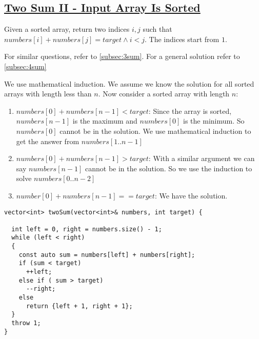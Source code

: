 \documentclass{book}
\begin{document}
	\subsection{\href{https://leetcode.com/problems/two-sum-ii-input-array-is-sorted/}{Two Sum II - Input Array Is Sorted}}
	\label{subsec:twosumii}
	Given a sorted array, return two indices $i, j$ such that $numbers[i] + numbers[j] = target \land i < j$. The indices start from $1$.
	\par For similar questions, refer to \ref{subsec:3sum}. For a general solution refer to \ref{subsec:4sum}
	\par We use mathematical induction. We assume we know the solution for all sorted arrays with length less than $n$. Now consider a sorted array with length $n$:
	\begin{enumerate}
		\item $numbers[0] + numbers[n - 1] < target$: Since the array is sorted, $numbers[n - 1]$ is the maximum and $numbers[0]$ is the minimum. So $numbers[0]$ cannot be in the solution. We use mathematical induction to get the answer from $numbers[1..n-1]$
		\item $numbers[0] + numbers[n - 1] > target$: With a similar argument we can say $numbers[n - 1]$ cannot be in the solution. So we use the induction to solve $numbers[0..n - 2]$
		\item $number[0] + numbers[n - 1] == target$: We have the solution.		
	\end{enumerate}
	\begin{lstlisting}
vector<int> twoSum(vector<int>& numbers, int target) {
  
  int left = 0, right = numbers.size() - 1;
  while (left < right)
  {
    const auto sum = numbers[left] + numbers[right];
    if (sum < target)
      ++left;
    else if ( sum > target)
      --right;
    else
      return {left + 1, right + 1};
  }
  throw 1;
}
	\end{lstlisting}
\end{document}
